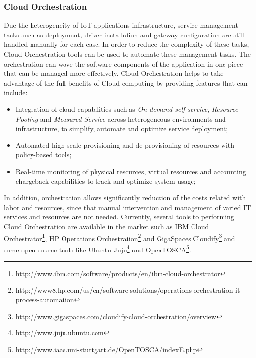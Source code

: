 \subsubsection{Cloud Orchestration}
\label{subs:cloud_orchestration}
Due the heterogeneity of IoT applications infrastructure, service management tasks
such as deployment, driver installation and gateway configuration are still handled
manually for each case. In order to reduce the complexity of these tasks, Cloud Orchestration
tools can be used to automate these management tasks. The orchestration can wove the
software components of the application in one piece that can be managed more effectively.
Cloud Orchestration helps to take advantage of the full benefits of Cloud computing by
providing features that can include:
\begin{itemize}
  \item Integration of cloud capabilities \cite{mell2011nist} such as \textit{On-demand self-service},
  \textit{Resource Pooling} and \textit{Measured Service} across heterogeneous environments and
  infrastructure, to simplify, automate and optimize service deployment;
  \item Automated high-scale provisioning and de-provisioning of resources with policy-based tools;
  \item Real-time monitoring of physical resources, virtual resources and accounting chargeback
  capabilities to track and optimize system usage;
\end{itemize}
In addition, orchestration allows significantly reduction of the costs related with labor
and resources, since that manual intervention and management of varied IT services and resources
are not needed. Currently, several tools to performing Cloud Orchestration are available
in the market such as IBM Cloud Orchestrator\footnote{http://www.ibm.com/software/products/en/ibm-cloud-orchestrator},
HP Operations Orchestration\footnote{http://www8.hp.com/us/en/software-solutions/operations-orchestration-it-process-automation}
and GigaSpaces Cloudify\footnote{http://www.gigaspaces.com/cloudify-cloud-orchestration/overview}
and some open-source tools like Ubuntu Juju\footnote{http://www.juju.ubuntu.com}
and OpenTOSCA\footnote{http://www.iaas.uni-stuttgart.de/OpenTOSCA/indexE.php}.\\
